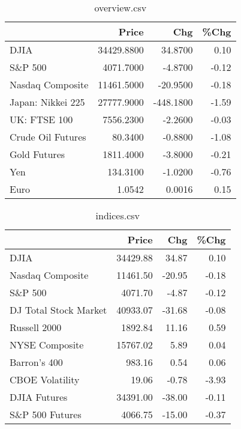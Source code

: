\documentclass{article}%
\begin{document}
\begin{table}[htbp]%
\caption{overview.csv}%
\centering%
\begin{adjustbox}{width=1\textwidth}%
\begin{tabular}{lrrr}
\toprule
                  &      Price &       Chg &  \%Chg \\
\midrule
             DJIA & 34429.8800 &   34.8700 &  0.10 \\
          S\&P 500 &  4071.7000 &   -4.8700 & -0.12 \\
 Nasdaq Composite & 11461.5000 &  -20.9500 & -0.18 \\
Japan: Nikkei 225 & 27777.9000 & -448.1800 & -1.59 \\
     UK: FTSE 100 &  7556.2300 &   -2.2600 & -0.03 \\
Crude Oil Futures &    80.3400 &   -0.8800 & -1.08 \\
     Gold Futures &  1811.4000 &   -3.8000 & -0.21 \\
              Yen &   134.3100 &   -1.0200 & -0.76 \\
             Euro &     1.0542 &    0.0016 &  0.15 \\
\bottomrule
\end{tabular}
%
\end{adjustbox}%
\end{table}

%


\begin{table}[htbp]%
\caption{indices.csv}%
\centering%
\begin{adjustbox}{width=1\textwidth}%
\begin{tabular}{lrrr}
\toprule
                      &    Price &    Chg &  \%Chg \\
\midrule
                 DJIA & 34429.88 &  34.87 &  0.10 \\
     Nasdaq Composite & 11461.50 & -20.95 & -0.18 \\
              S\&P 500 &  4071.70 &  -4.87 & -0.12 \\
DJ Total Stock Market & 40933.07 & -31.68 & -0.08 \\
         Russell 2000 &  1892.84 &  11.16 &  0.59 \\
       NYSE Composite & 15767.02 &   5.89 &  0.04 \\
         Barron's 400 &   983.16 &   0.54 &  0.06 \\
      CBOE Volatility &    19.06 &  -0.78 & -3.93 \\
         DJIA Futures & 34391.00 & -38.00 & -0.11 \\
      S\&P 500 Futures &  4066.75 & -15.00 & -0.37 \\
\bottomrule
\end{tabular}
%
\end{adjustbox}%
\end{table}
\end{document}
